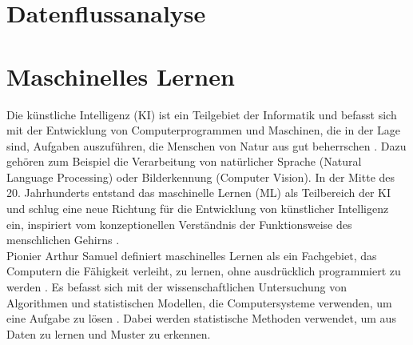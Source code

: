 \documentclass[german,bachelor]{swsLeipzig}
\begin{document}
\section{Datenflussanalyse}

\section{Maschinelles Lernen}
Die künstliche Intelligenz (KI) ist ein Teilgebiet der Informatik und befasst sich mit der Entwicklung von Computerprogrammen und Maschinen,
die in der Lage sind, Aufgaben auszuführen, die Menschen von Natur aus gut beherrschen \cite[S. 1]{2020}.
Dazu gehören zum Beispiel die Verarbeitung von natürlicher Sprache (Natural Language Processing) oder Bilderkennung (Computer Vision).
In der Mitte des 20. Jahrhunderts entstand das maschinelle Lernen (ML) als Teilbereich der KI und schlug eine neue Richtung
für die Entwicklung von künstlicher Intelligenz ein, inspiriert vom konzeptionellen Verständnis der Funktionsweise des menschlichen Gehirns \cite[S. 1]{2020}.\\

Pionier Arthur Samuel definiert maschinelles Lernen als ein Fachgebiet, das Computern die Fähigkeit verleiht, zu lernen,
ohne ausdrücklich programmiert zu werden \cite[S. 381]{mahesh2020machine}.
Es befasst sich mit der wissenschaftlichen Untersuchung von Algorithmen und statistischen Modellen,
die Computersysteme verwenden, um eine Aufgabe zu lösen \cite[S. 381]{mahesh2020machine}.
Dabei werden statistische Methoden verwendet, um aus Daten zu lernen und Muster zu erkennen. \\

\end{document}
